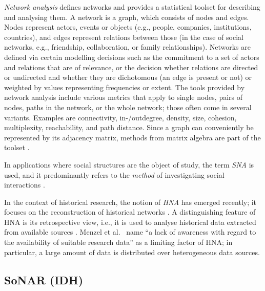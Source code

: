 \emph{Network analysis}
defines networks and provides a statistical toolset for describing and analysing them.
A network is a graph, which consists of nodes and edges.
Nodes represent actors, events or objects (e.g., people, companies, institutions, countries),
and edges represent relations between those (in the case of social networks, e.g.,
friendship, collaboration, or family relationships).
Networks are defined via certain modelling decisions
such as the commitment to a set of actors and relations that are of relevance,
or the decision whether relations are directed or undirected
and whether they are dichotomous (an edge is present or not)
or weighted by values representing frequencies or extent.
The tools provided by network analysis include
various metrics that apply to single nodes, pairs of nodes, paths in the network,
or the whole network; those often come in several variants.
Examples are connectivity, in-/outdegree, density,
size, cohesion, multiplexity, reachability, and path distance.
Since a graph can conveniently be represented by its adjacency matrix,
methods from matrix algebra are part of the toolset \autocite[cf.][§§1.1, 3.3, 5.3]{Jansen2003}.

In applications where social structures are the object of study,
the term \emph{\gls{SNA}} is used,
and it predominantly refers to the \emph{method} of investigating
social interactions \autocite{Otte2002}.

In the context of historical research,
the notion of \emph{\gls{HNA}}
has emerged recently; it focuses on the reconstruction of
historical networks \autocite{Menzel2020}.
A distinguishing feature of \gls{HNA} is its retrospective view,
i.e., it is used to analyse historical data extracted
from available sources \autocite{Fangerau2022}.
Menzel et al.\ \autocite*{Menzel2020} name
\enquote{a lack of awareness with regard to the availability of suitable research data}
as a limiting factor of \gls{HNA};
in particular, a large amount of data is distributed over heterogeneous data sources.

\subsection{SoNAR (IDH)}
\label{subsec:SoNAR_reports}


